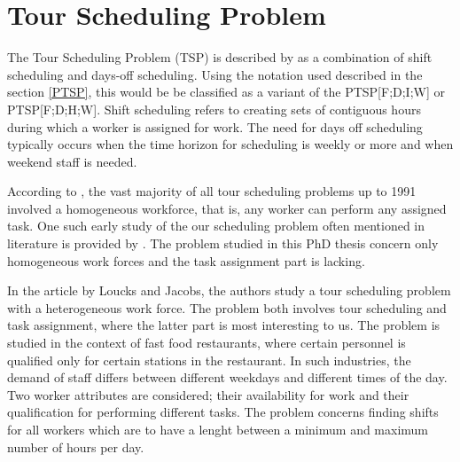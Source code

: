 
 

%
%
%
%


\section{Tour Scheduling Problem}\label{TSP}

The Tour Scheduling Problem (TSP) is described by \citet{loucks_1991} as a combination of shift scheduling and days-off scheduling. Using the notation used described in the section \ref{PTSP}, this would be be classified as a variant of the PTSP[F;D;I;W] or PTSP[F;D;H;W]. Shift scheduling refers to creating sets of contiguous hours during which a worker is assigned for work. The need for days off scheduling typically occurs when the time horizon for scheduling is weekly or more and when weekend staff is needed.

According to \citet{loucks_1991}, the vast majority of all tour scheduling problems up to 1991 involved a homogeneous workforce, that is, any worker can perform any assigned task. One such early study of the our scheduling problem often mentioned in literature is provided by \citet{thompson_1988}. The problem studied in this PhD thesis concern only homogeneous work forces and the task assignment part is lacking.

In the article by Loucks and Jacobs, the authors study a tour scheduling problem with a heterogeneous work force. The problem both involves tour scheduling and task assignment, where the latter part is most interesting to us. The problem is studied in the context of fast food restaurants, where certain personnel is qualified only for certain stations in the restaurant. In such industries, the demand of staff differs between different weekdays and different times of the day. Two worker attributes are considered; their availability for work and their qualification for performing different tasks. The problem concerns finding shifts for all workers which are to have a lenght between a minimum and maximum number of hours per day.

